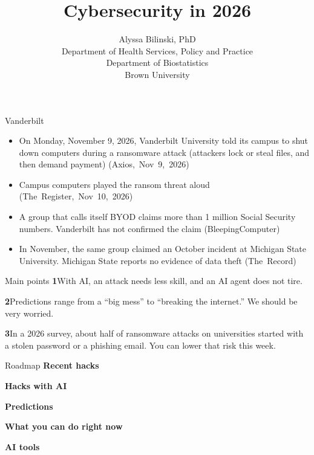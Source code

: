 \documentclass[11pt]{beamer}
\newcommand{\srccite}[1]{{\scriptsize\textcolor{citecol}{#1}}}
\newcommand{\rmapnum}[1]{\textcolor{brownred}{\textbf{#1}}}
\newcommand{\vfy}{\unskip}
\newcommand{\vfy}{\unskip\nobreakspace{\scriptsize\textcolor{citecol}{[verify]}}}
\renewcommand{\srccite}[1]{{\scriptsize\textcolor{citecol}{\mbox{#1}}}}
\begin{document}
\title[Cybersecurity in 2026]{Cybersecurity in 2026}
\author[Bilinski]{%
\small
Alyssa Bilinski, PhD \\[6pt]
\footnotesize
Department of Health Services, Policy and Practice \\
Department of Biostatistics \\
Brown University}
\date{}
\titlegraphic{}
\begin{frame}[plain]
\titlepage
\end{frame}


\begin{frame}{Vanderbilt}
\pause
\begin{itemize}\setlength\itemsep{9pt}
\item On Monday, November 9, 2026, Vanderbilt University told its campus to shut down computers during a ransomware attack (attackers lock or steal files, and then demand payment) \srccite{(Axios, Nov 9, 2026)} \vfy \pause
\item Campus computers played the ransom threat aloud \srccite{(The Register, Nov 10, 2026)} \vfy \pause
\item A group that calls itself BYOD claims more than 1 million Social Security numbers. Vanderbilt has not confirmed the claim \srccite{(BleepingComputer)} \vfy \pause
\item In November, the same group claimed an October incident at Michigan State University. Michigan State reports no evidence of data theft \srccite{(The Record)} \vfy
\end{itemize}
\end{frame}


\begin{frame}{Main points}
\vfill
\pause
{\large\rmapnum{1}\quad With AI, an attack needs less skill, and an AI agent does not tire.}\par
\vfill
\pause
{\large\rmapnum{2}\quad Predictions range from a ``big mess'' to ``breaking the internet.'' We should be very worried.}\par
\vfill
\pause
{\large\rmapnum{3}\quad In a 2026 survey, about half of ransomware attacks on universities started with a stolen password or a phishing email. You can lower that risk this week.}\par
\vfill
\end{frame}


\begin{frame}{Roadmap}
\vfill
{\large\textbf{Recent hacks}}\par
\vfill
{\large\textbf{Hacks with AI}}\par
\vfill
{\large\textbf{Predictions}}\par
\vfill
{\large\textbf{What you can do right now}}\par
\vfill
{\large\textbf{AI tools}}\par
\vfill
\end{frame}
\end{document}

